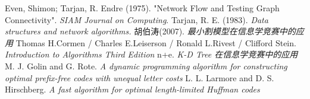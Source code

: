 \begin{thebibliography}{999}
	 Even, Shimon; Tarjan, R. Endre (1975).
	"Network Flow and Testing Graph Connectivity".
    \emph{SIAM Journal on Computing}.
     Tarjan, R. E. (1983).
    \emph{Data structures and network algorithms.}
    胡伯涛(2007). \emph{最小割模型在信息学竞赛中的应用}
      Thomas H.Cormen / Charles E.Leiserson /
     Ronald L.Rivest / Clifford Stein.
     \emph{Introduction to Algorithms Third Edition}
    n+e. \emph{K-D Tree 在信息学竞赛中的应用}
    M. J. Golin and G. Rote.
    \emph{A dynamic programming algorithm for constructing optimal
    prefix-free codes with unequal letter costs}
    L. L. Larmore and D. S. Hirschberg.
    \emph{A fast algorithm for optimal length-limited Huffman codes}
\end{thebibliography}
